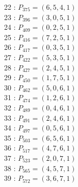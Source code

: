 \documentclass{article}
\begin{document}
{\begin{multicols}{2}
22 : $P_{375}=( 6, 5, 4, 1 )$\\
23 : $P_{396}=( 3, 0, 5, 1 )$\\
24 : $P_{409}=( 0, 2, 5, 1 )$\\
25 : $P_{416}=( 7, 2, 5, 1 )$\\
26 : $P_{417}=( 0, 3, 5, 1 )$\\
27 : $P_{422}=( 5, 3, 5, 1 )$\\
28 : $P_{427}=( 2, 4, 5, 1 )$\\
29 : $P_{450}=( 1, 7, 5, 1 )$\\
30 : $P_{462}=( 5, 0, 6, 1 )$\\
31 : $P_{474}=( 1, 2, 6, 1 )$\\
32 : $P_{489}=( 0, 4, 6, 1 )$\\
33 : $P_{491}=( 2, 4, 6, 1 )$\\
34 : $P_{497}=( 0, 5, 6, 1 )$\\
35 : $P_{503}=( 6, 5, 6, 1 )$\\
36 : $P_{517}=( 4, 7, 6, 1 )$\\
37 : $P_{523}=( 2, 0, 7, 1 )$\\
38 : $P_{565}=( 4, 5, 7, 1 )$\\
39 : $P_{572}=( 3, 6, 7, 1 )$\\
\end{multicols}
}
\end{document}
